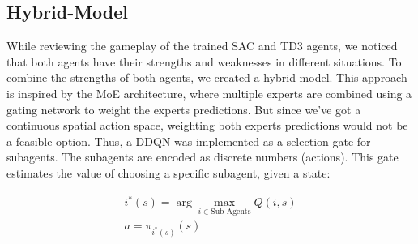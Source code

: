 
\subsection{Hybrid-Model}\label{sec:hybrid}
While reviewing the gameplay of the trained \ac{SAC} and \ac{TD3} agents,
we noticed that both agents have their strengths and weaknesses in different situations.
To combine the strengths of both agents, we created a hybrid model.
This approach is inspired by the \ac{MoE} architecture, where multiple experts are combined using a gating network to weight the experts predictions.
But since we've got a continuous spatial action space, weighting both experts predictions would not be a feasible option.
Thus, a \ac{DDQN} \cite{vanhasselt2015deepreinforcementlearningdouble} was implemented as a selection gate for subagents. The subagents are encoded as discrete numbers (actions).
This gate estimates the value of choosing a specific subagent, given a state:

\begin{gather}
    i^*(s) = \arg\max_{i \in \text{Sub-Agents}} Q(i, s) \\
    a = \pi_{i^*(s)}(s)
\end{gather}

